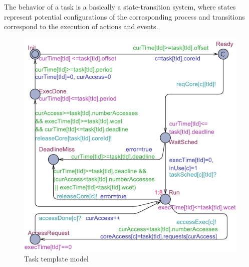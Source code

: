 The behavior of a task is a basically a state-transition system, where states represent potential configurations of the corresponding process and transitions correspond to the execution of actions and events. 

\begin{figure}
\centering
\vspace{1mm}
\caption{Task template model}
\label{fig:task}
\includegraphics[scale=0.44]{Task.pdf}
\vspace{-7mm}
\end{figure}


